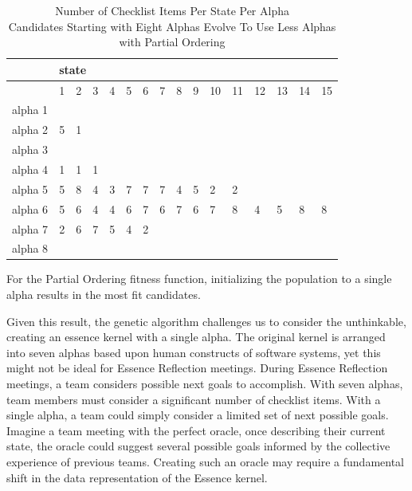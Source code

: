 \documentclass[preprint,12pt,3p]{elsarticle}
\begin{document}
\begin{table}
\caption{Number of Checklist Items Per State Per Alpha \\ Candidates Starting with Eight Alphas Evolve To Use Less Alphas with Partial Ordering}
\label{PartialOrderingPrefersLessAlphas}
\centering
\begin{tabular}{|l|l|l|l|l|l|l|l|l|l|l|l|l|l|l|l|}
\hline
 & \multicolumn{15}{l|}{state} \\ \hline
 & 1  & 2  & 3  & 4  & 5  & 6  & 7  & 8  & 9  & 10  & 11  & 12  & 13  & 14  & 15 \\ \hline
alpha 1 &   &   &   &   &   &   &   &   &   &   &   &   &   &   &   \\ \hline
alpha 2 & 5 & 1 &   &   &   &   &   &   &   &   &   &   &   &   &   \\ \hline
alpha 3 &   &   &   &   &   &   &   &   &   &   &   &   &   &   &   \\ \hline
alpha 4 & 1 & 1 & 1 &   &   &   &   &   &   &   &   &   &   &   &   \\ \hline
alpha 5 & 5 & 8 & 4 & 3 & 7 & 7 & 7 & 4 & 5 & 2 & 2 &   &   &   &   \\ \hline
alpha 6 & 5 & 6 & 4 & 4 & 6 & 7 & 6 & 7 & 6 & 7 & 8 & 4 & 5 & 8 & 8 \\ \hline
alpha 7 & 2 & 6 & 7 & 5 & 4 & 2 &   &   &   &   &   &   &   &   &   \\ \hline
alpha 8 &   &   &   &   &   &   &   &   &   &   &   &   &   &   &   \\ \hline
\end{tabular}
\end{table}

For the Partial Ordering fitness function, initializing the population to a single alpha results in the most fit candidates. 

Given this result, the genetic algorithm challenges us to consider the unthinkable, creating an essence kernel with a single alpha. The original kernel is arranged into seven alphas based upon human constructs of software systems, yet this might not be ideal for Essence Reflection meetings. During Essence Reflection meetings, a team considers possible next goals to accomplish. With seven alphas, team members must consider a significant number of checklist items. With a single alpha, a team could simply consider a limited set of next possible goals. Imagine a team meeting with the perfect oracle, once describing their current state, the oracle could suggest several possible goals informed by the collective experience of previous teams. Creating such an oracle may require a fundamental shift in the data representation of the Essence kernel.
\end{document}
